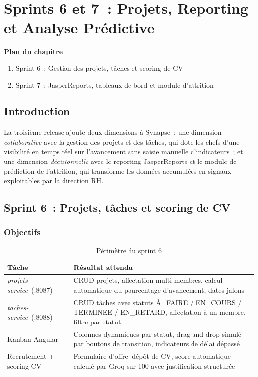 \chapter{Sprints 6 et 7~: Projets, Reporting et Analyse Prédictive}

\noindent\textbf{Plan du chapitre}
\begin{enumerate}[nosep]
  \item Sprint 6~: Gestion des projets, tâches et scoring de CV
  \item Sprint 7~: JasperReports, tableaux de bord et module d'attrition
\end{enumerate}

\section{Introduction}

La troisième release ajoute deux dimensions à Synapse~: une dimension
\textit{collaborative} avec la gestion des projets et des tâches, qui dote les
chefs d'une visibilité en temps réel sur l'avancement sans saisie manuelle
d'indicateurs~; et une dimension \textit{décisionnelle} avec le reporting
JasperReports et le module de prédiction de l'attrition, qui transforme les
données accumulées en signaux exploitables par la direction RH.

\section{Sprint 6~: Projets, tâches et scoring de CV}

\subsection{Objectifs}

\begin{table}[H]
\centering
\caption{Périmètre du sprint 6}
\label{tab:s6}
\begin{tabularx}{\textwidth}{|l|L|}
\hline
{}\textbf{Tâche} & \textbf{Résultat attendu} \\\hline
{}
\textit{projets-service}~(:8087) & CRUD projets, affectation multi-membres, calcul
  automatique du pourcentage d'avancement, dates jalons \\\hline
\textit{taches-service}~(:8088) & CRUD tâches avec statuts À\_FAIRE / EN\_COURS /
  TERMINEE / EN\_RETARD, affectation à un membre, filtre par statut \\\hline
{}
Kanban Angular & Colonnes dynamiques par statut, drag-and-drop simulé par boutons
  de transition, indicateurs de délai dépassé \\\hline
Recrutement + scoring CV & Formulaire d'offre, dépôt de CV, score automatique
  calculé par Groq sur 100 avec justification structurée \\\hline
\end{tabularx}
\end{table}

